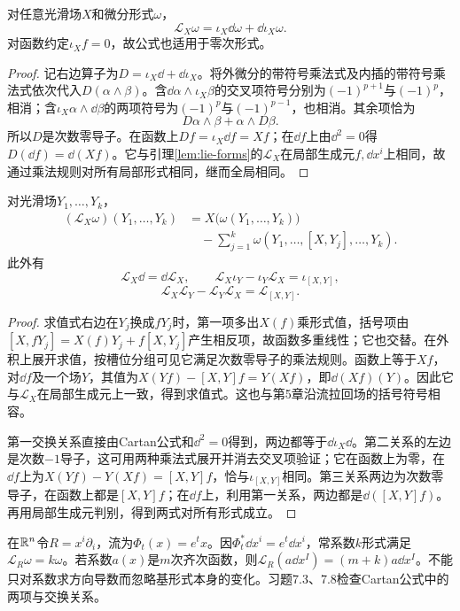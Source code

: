 \begin{theorem}[Cartan公式]\label{thm:cartan}
对任意光滑场$X$和微分形式$\omega$，
\[
 \mathcal L_X\omega=\iota_X\dd\omega+\dd\iota_X\omega.
\]
对函数约定$\iota_Xf=0$，故公式也适用于零次形式。
\end{theorem}
\begin{proof}
记右边算子为$D=\iota_X\dd+\dd\iota_X$。将外微分的带符号乘法式及内插的带符号乘法式依次代入$D(\alpha\wedge\beta)$。含$\dd\alpha\wedge\iota_X\beta$的交叉项符号分别为$(-1)^{p+1}$与$(-1)^p$，相消；含$\iota_X\alpha\wedge\dd\beta$的两项符号为$(-1)^p$与$(-1)^{p-1}$，也相消。其余项恰为
\[
 D\alpha\wedge\beta+\alpha\wedge D\beta.
\]
所以$D$是次数零导子。在函数上$Df=\iota_X\dd f=Xf$；在$\dd f$上由$\dd^2=0$得$D(\dd f)=\dd(Xf)$。它与引理\ref{lem:lie-forms}的$\mathcal L_X$在局部生成元$f,\dd x^i$上相同，故通过乘法规则对所有局部形式相同，继而全局相同。
\end{proof}
\begin{proposition}[求值式与Cartan交换关系]\label{prop:cartan-identities}
对光滑场$Y_1,\ldots,Y_k$，
\begin{align*}
 (\mathcal L_X\omega)(Y_1,\ldots,Y_k)
 &=X\bigl(\omega(Y_1,\ldots,Y_k)\bigr)\\
 &\quad-\sum_{j=1}^k\omega(Y_1,\ldots,[X,Y_j],\ldots,Y_k).
\end{align*}
此外有
\[
 \mathcal L_X\dd=\dd\mathcal L_X,\qquad
 \mathcal L_X\iota_Y-\iota_Y\mathcal L_X=\iota_{[X,Y]},
\]
\[
 \mathcal L_X\mathcal L_Y-\mathcal L_Y\mathcal L_X=\mathcal L_{[X,Y]}.
\]
\end{proposition}
\begin{proof}
求值式右边在$Y_j$换成$fY_j$时，第一项多出$X(f)$乘形式值，括号项由$[X,fY_j]=X(f)Y_j+f[X,Y_j]$产生相反项，故函数多重线性；它也交替。在外积上展开求值，按槽位分组可见它满足次数零导子的乘法规则。函数上等于$Xf$，对$\dd f$及一个场$Y$，其值为$X(Yf)-[X,Y]f=Y(Xf)$，即$\dd(Xf)(Y)$。因此它与$\mathcal L_X$在局部生成元上一致，得到求值式。这也与第5章沿流拉回场的括号符号相容。

第一交换关系直接由Cartan公式和$\dd^2=0$得到，两边都等于$\dd\iota_X\dd$。第二关系的左边是次数$-1$导子，这可用两种乘法式展开并消去交叉项验证；它在函数上为零，在$\dd f$上为$X(Yf)-Y(Xf)=[X,Y]f$，恰与$\iota_{[X,Y]}$相同。第三关系两边为次数零导子，在函数上都是$[X,Y]f$；在$\dd f$上，利用第一关系，两边都是$\dd([X,Y]f)$。再用局部生成元判别，得到两式对所有形式成立。
\end{proof}
\begin{example}[沿伸缩流的次数权重]
在$\mathbb{R}^n$令$R=x^i\partial_i$，流为$\Phi_t(x)=e^tx$。因$\Phi_t^*\dd x^i=e^t\dd x^i$，常系数$k$形式满足$\mathcal L_R\omega=k\omega$。若系数$a(x)$是$m$次齐次函数，则$\mathcal L_R(a\dd x^I)=(m+k)a\dd x^I$。不能只对系数求方向导数而忽略基形式本身的变化。习题7.3、7.8检查Cartan公式中的两项与交换关系。
\end{example}
